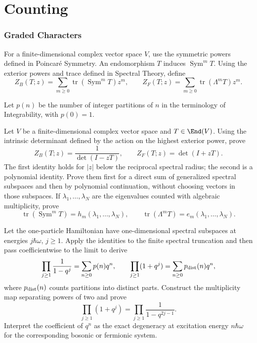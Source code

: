 \part{Counting}

\section{Graded Characters}


\begin{exercise}
For a finite-dimensional complex vector space $V$, use the symmetric
powers defined in Poincar\'e Symmetry.  An endomorphism $T$ induces
$\operatorname{Sym}^mT$.  Using the exterior powers and trace defined in
Spectral Theory, define
\[
Z_B(T;z)=\sum_{m\geq0}\operatorname{tr}(\operatorname{Sym}^mT)z^m,
\qquad
Z_F(T;z)=\sum_{m\geq0}\operatorname{tr}(\Lambda^mT)z^m.
\]

Let $p(n)$ be the number of integer partitions of $n$ in the terminology
of Integrability, with $p(0)=1$.

Let $V$ be a finite-dimensional complex vector space and $T\in\End(V)$.
Using the intrinsic determinant defined by the action on the highest
exterior power, prove
\[
Z_B(T;z)=\frac1{\det(I-zT)},
\qquad
Z_F(T;z)=\det(I+zT).
\]
The first identity holds for $|z|$ below the reciprocal spectral radius;
the second is a polynomial identity.  Prove them first for a direct sum of
generalized spectral subspaces and then by polynomial continuation, without
choosing vectors in those subspaces.
If $\lambda_1,\ldots,\lambda_N$ are the eigenvalues counted with algebraic
multiplicity, prove
\[
\operatorname{tr}(\operatorname{Sym}^mT)
=h_m(\lambda_1,\ldots,\lambda_N),
\qquad
\operatorname{tr}(\Lambda^mT)
=e_m(\lambda_1,\ldots,\lambda_N).
\]

Let the one-particle Hamiltonian have one-dimensional spectral subspaces at
energies $j\hbar\omega$, $j\geq1$.  Apply the identities to the finite
spectral truncation and then pass coefficientwise to the limit to derive
\[
\prod_{j\geq1}\frac1{1-q^j}
=\sum_{n\geq0}p(n)q^n,
\qquad
\prod_{j\geq1}(1+q^j)
=\sum_{n\geq0}p_{\rm dist}(n)q^n,
\]
where $p_{\rm dist}(n)$ counts partitions into distinct parts.  Construct
the multiplicity map separating powers of two and prove
\[
\prod_{j\geq1}(1+q^j)
=\prod_{j\geq1}\frac1{1-q^{2j-1}}.
\]
Interpret the coefficient of $q^n$ as the exact degeneracy at excitation
energy $n\hbar\omega$ for the corresponding bosonic or fermionic system.


\end{exercise}
